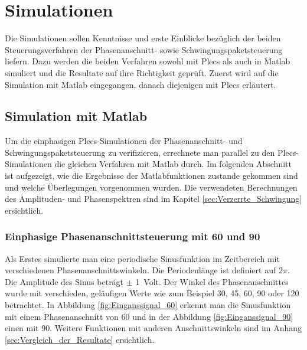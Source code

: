 \section{Simulationen}

Die Simulationen sollen Kenntnisse und erste Einblicke bezüglich der beiden Steuerungsverfahren der Phasenanschnitt- sowie Schwingungspaketsteuerung liefern. Dazu werden die beiden Verfahren sowohl mit Plecs als auch in Matlab simuliert und die Resultate auf ihre Richtigkeit geprüft. Zuerst wird auf die Simulation mit Matlab eingegangen, danach diejenigen mit Plecs erläutert.

\subsection{Simulation mit Matlab}\label{sec:Simulation_mit_Matlab}
Um die einphasigen Plecs-Simulationen der Phasenanschnitt- und Schwingungspaketsteuerung zu verifizieren, errechnete man parallel zu den Plecs-Simulationen die gleichen Verfahren mit Matlab durch. Im folgenden Abschnitt ist aufgezeigt, wie die Ergebnisse der Matlabfunktionen zustande gekommen sind und welche Überlegungen vorgenommen wurden. Die verwendeten Berechnungen des Amplituden- und Phasenspektren sind im Kapitel \ref{sec:Verzerrte_Schwingung} ersichtlich.

\subsubsection{Einphasige Phasenanschnittsteuerung mit 60\textdegree\hspace{0.02cm} und 90\textdegree}
Als Erstes simulierte man eine periodische Sinusfunktion im Zeitbereich mit verschiedenen Phasenanschnittswinkeln. Die Periodenlänge ist definiert auf 2$\pi$. Die Amplitude des Sinus beträgt $\pm$ \SI{1}{Volt}. Der Winkel des Phasenanschnittes wurde mit verschieden, geläufigen Werte wie zum Beispiel 30\textdegree, 45\textdegree \hspace{0.02cm}, 60\textdegree \hspace{0.02cm}, 90\textdegree \hspace{0.02cm} oder 120\textdegree \hspace{0.02cm} betrachtet. In Abbildung \ref{fig:Einganssignal_60} erkennt man die Sinusfunktion mit einem Phasenanschnitt von 60\textdegree \hspace{0.02cm} und in der Abbildung \ref{fig:Einganssignal_90} einen mit 
90\textdegree \hspace{0.02cm}. Weitere Funktionen mit anderen Anschnittswinkeln sind im Anhang \ref{sec:Vergleich_der_Resultate} ersichtlich.

